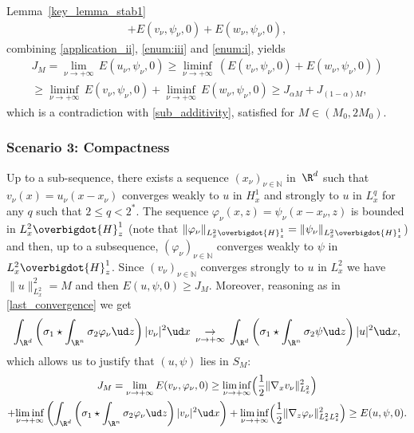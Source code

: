 \begin{ProofOf}{Lemma~\ref{key_lemma_stab1}}
\begin{multline*}
+E(v_{\nu},\psi_{\nu},0)+E(w_{\nu},\psi_{\nu},0),
\end{multline*}
\egroup
combining \eqref{application_ii}, \eqref{enum:iii} and \eqref{enum:i}, yields
\begin{multline*}
J_{M}=\underset{\nu\to +\infty}{\lim}\,E(u_{\nu},\psi_{\nu},0)\geq\underset{\nu\to+\infty}{\liminf}\,\left(E(v_{\nu},\psi_{\nu},0)+E(w_{\nu},\psi_{\nu},0)\right)\\
\geq\underset{\nu\to+\infty}{\liminf}\,E(v_{\nu},\psi_{\nu},0)+\underset{\nu\to+\infty}{\liminf}\,E(w_{\nu},\psi_{\nu},0)\geq J_{\alpha M}+J_{(1-\alpha)M},
\end{multline*}
which is a contradiction with \eqref{sub_additivity}, satisfied for $M\in (M_0,2M_0)$.

\subsubsection*{Scenario 3: Compactness} Up to a sub-sequence, there exists a sequence $(x_{\nu})_{\nu\in\mathbb N}$ in~$\R^{d}$ such that $v_{\nu}(x)=u_{\nu}(x-x_{\nu})$ converges weakly to $u$ in $H_{x}^{1}$ and strongly to $u$ in $L_{x}^{q}$ for any $q$ such that $2\leq q<2^{*}$. The sequence $\varphi_{\nu}(x,z)=\psi_{\nu}(x-x_{\nu},z)$ is bounded in $L_{x}^{2}\overbigdot{H}_{z}^{1}$ (note that $\|\varphi_{\nu}\|_{L_{x}^{2}\overbigdot{H}_{z}^{1}}=\|\psi_{\nu}\|_{L_{x}^{2}\overbigdot{H}_{z}^{1}}$) and then, up to a subsequence, $(\varphi_{\nu})_{\nu\in\mathbb N}$ converges weakly to $\psi$ in $L_{x}^{2}\overbigdot{H}_{z}^{1}$. Since $(v_{\nu})_{\nu\in\mathbb N}$ converges strongly to $u$ in $L_{x}^{2}$ we have $\|u\|_{L_{x}^{2}}^{2}=M$ and then $E(u,\psi,0)\geq J_{M}$. Moreover, reasoning as in \eqref{last_convergence} we get
\begin{equation}\label{cv1}
\int_{\R^{d}}\left(\sigma_{1}\star\int_{\R^{n}}\sigma_{2}\varphi_{\nu}\ud z\right)|v_{\nu}|^{2}\ud x\,\underset{\nu\to+\infty}{\to}\,\int_{\R^{d}}\left(\sigma_{1}\star\int_{\R^{n}}\sigma_{2}\psi\ud z\right)|u|^{2}\ud x,
\end{equation}
which allows us to justify that $(u,\psi)$ lies in $S_{M}$:
\bgroup
{}
\begin{multline*}
J_{M}=\underset{\nu\to+\infty}{\lim}\,E(v_{\nu},\varphi_{\nu},0)\geq\underset{\nu\to+\infty}{\liminf}\Bigl(\frac{1}{2}\|\nabla_{x}v_{\nu}\|_{L_{x}^{2}}^{2}\Bigr)\\
+\underset{\nu\to +\infty}{\liminf}\left(\int_{\R^{d}}\left(\sigma_{1}\star\int_{\R^{n}}\sigma_{2}\varphi_{\nu}\ud z\right)|v_{\nu}|^{2}\ud x\right)+\underset{\nu\to+\infty}{\liminf}\Bigl(\frac{1}{2}\|\nabla_{z}\varphi_{\nu}\|_{L_{x}^{2}L_{z}^{2}}^{2}\Bigr)\geq E(u,\psi,0).

\end{multline*}
\end{ProofOf}
